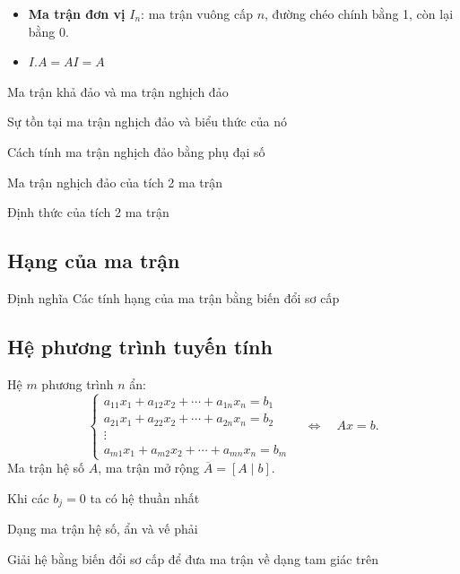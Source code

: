 \documentclass[12pt,a4paper]{article}
\begin{document}
\begin{dinhnghia}
  \begin{itemize}
    \item \textbf{Ma trận đơn vị} $I_n$: ma trận vuông cấp $n$, đường chéo chính bằng 1, còn lại bằng 0.
    \item $I.A = AI = A$
  \end{itemize}
\end{dinhnghia}

Ma trận khả đảo và ma trận nghịch đảo

Sự tồn tại ma trận nghịch đảo và biểu thức của nó

Cách tính ma trận nghịch đảo bằng phụ đại số

Ma trận nghịch đảo của tích 2 ma trận

Định thức của tích 2 ma trận

\subsection{Hạng của ma trận}

Định nghĩa
Các tính hạng của ma trận bằng biến đổi sơ cấp

\subsection{Hệ phương trình tuyến tính}

\begin{dinhnghia}
  Hệ $m$ phương trình $n$ ẩn:
  \[
    \begin{cases}
      a_{11}x_1 + a_{12}x_2 + \cdots + a_{1n}x_n = b_1 \\
      a_{21}x_1 + a_{22}x_2 + \cdots + a_{2n}x_n = b_2 \\
      \vdots \\
      a_{m1}x_1 + a_{m2}x_2 + \cdots + a_{mn}x_n = b_m
    \end{cases}
    \quad \Leftrightarrow \quad Ax = b.
  \]
  Ma trận hệ số $A$, ma trận mở rộng $\overline{A} = [A \mid b]$.

  Khi các $b_j = 0$ ta có hệ thuần nhất
\end{dinhnghia}

Dạng ma trận hệ số, ẩn và vế phải

Giải hệ bằng biến đổi sơ cấp để đưa ma trận về dạng tam giác trên
\end{document}
